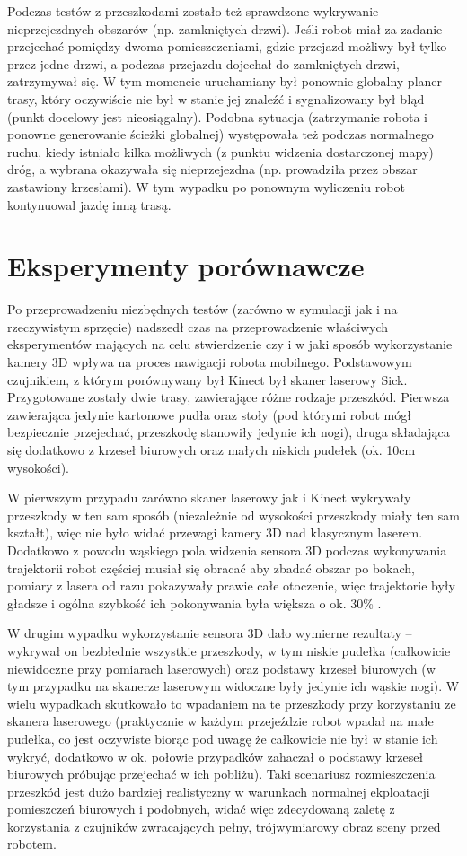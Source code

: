 Podczas testów z przeszkodami zostało też sprawdzone wykrywanie nieprzejezdnych
obszarów (np. zamkniętych drzwi). Jeśli robot miał za zadanie przejechać pomiędzy
dwoma pomieszczeniami, gdzie przejazd możliwy był tylko przez jedne drzwi,
a podczas przejazdu dojechał do zamkniętych drzwi, zatrzymywał się. W tym 
momencie uruchamiany był ponownie globalny planer trasy, który oczywiście
nie był w stanie jej znaleźć i sygnalizowany był błąd (punkt docelowy jest
nieosiągalny). Podobna sytuacja (zatrzymanie robota i ponowne generowanie 
ścieżki globalnej) występowała też podczas normalnego ruchu, kiedy istniało
kilka możliwych (z punktu widzenia dostarczonej mapy) dróg, a wybrana okazywała
się nieprzejezdna (np. prowadziła przez obszar zastawiony krzesłami). W tym 
wypadku po ponownym wyliczeniu robot kontynuowal jazdę inną trasą.

\section{Eksperymenty porównawcze}

Po przeprowadzeniu niezbędnych testów (zarówno w symulacji jak i na rzeczywistym
sprzęcie) nadszedł czas na przeprowadzenie właściwych eksperymentów mających
na celu stwierdzenie czy i w jaki sposób wykorzystanie kamery 3D wpływa na
proces nawigacji robota mobilnego. Podstawowym czujnikiem, z którym porównywany
był Kinect był skaner laserowy Sick. Przygotowane zostały dwie trasy, zawierające
różne rodzaje przeszkód. Pierwsza zawierająca jedynie kartonowe pudła oraz
stoły (pod którymi robot mógł bezpiecznie przejechać, przeszkodę stanowiły 
jedynie ich nogi), druga składająca się dodatkowo z krzeseł biurowych oraz
małych niskich pudełek (ok. 10cm wysokości). 

W pierwszym przypadu zarówno skaner laserowy jak i Kinect wykrywały przeszkody 
w ten sam sposób (niezależnie od wysokości przeszkody miały ten sam kształt), 
więc nie było widać przewagi kamery 3D nad klasycznym laserem. Dodatkowo z powodu
wąskiego pola widzenia sensora 3D podczas wykonywania trajektorii robot częściej
musiał się obracać aby zbadać obszar po bokach, pomiary z lasera od razu
pokazywały prawie całe otoczenie, więc trajektorie były gładsze i ogólna
szybkość ich pokonywania była większa o ok. 30\% .

W drugim wypadku wykorzystanie sensora 3D dało wymierne rezultaty -- wykrywał
on bezbłednie wszystkie przeszkody, w tym niskie pudełka (całkowicie niewidoczne
przy pomiarach laserowych) oraz podstawy krzeseł biurowych (w tym przypadku 
na skanerze laserowym widoczne były jedynie ich wąskie nogi). W wielu wypadkach
skutkowało to wpadaniem na te przeszkody przy korzystaniu ze skanera laserowego
(praktycznie w każdym przejeździe robot wpadał na małe pudełka, co jest 
oczywiste biorąc pod uwagę że całkowicie nie był w stanie ich wykryć, dodatkowo
w ok. połowie przypadków zahaczał o podstawy krzeseł biurowych próbując 
przejechać w ich pobliżu). Taki scenariusz rozmieszczenia przeszkód jest 
dużo bardziej realistyczny w warunkach normalnej ekploatacji pomieszczeń 
biurowych i podobnych, widać więc zdecydowaną zaletę z korzystania z czujników
zwracających pełny, trójwymiarowy obraz sceny przed robotem. 


